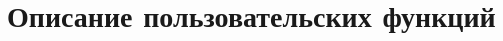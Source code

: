 \section{Описание пользовательских функций}

\begin{comment}

Все функции и модули, реализованные в ходе выполнения данной курсовой работы, представленны в таблице \ref{funcsnmodules}.

\begin{table}[h!]
	\caption{Описание пользовательских функций и модулей программы}
    \centering
	\label{funcsnmodules}
    \scalebox{1}{
	\begin{tabular}{|p{2.5cm}|p{4cm}|p{2.5cm}|p{2cm}|p{1.5cm}|}
		\hline
		Имя модуля & Имя функции & Назначение & Параметры функции & Возращ\nl аемое значение функции \\
		\hline
		truck\_brand.h & str & Получение марки грузовика в виде строки & TruckBrand truck\_brand & std::string\\
		\hline
        
        administrator\nl\_console.h & AdministratorConsole & use-case & - & returns\\
        \hline
        administrator\nl\_console.h & Run & use-case & - & returns\\
        \hline
        administrator\nl\_console.h & \_loadRealPassword & use-case & - & returns\\
        \hline
        administrator\nl\_console.h & \_uploadPassword & use-case & - & returns\\
        \hline
        administrator\nl\_console.h & \_getch & use-case & - & returns\\
        \hline
        administrator\nl\_console.h & \_inputPassword & use-case & - & returns\\
        \hline
        administrator\nl\_console.h & \_verifyPassword & use-case & - & returns\\
        \hline
        administrator\nl\_console.h & \_mainMenu & use-case & - & returns\\
        \hline
        administrator\nl\_console.h & \_truckMenu & use-case & - & returns\\
        \hline
        administrator\nl\_console.h & \_driverMenu & use-case & - & returns\\
        \hline
        administrator\nl\_console.h & \_routeMenu & use-case & - & returns\\
        \hline
        administrator\nl\_console.h & \_changePassword & use-case & - & returns\\
        \hline
	\end{tabular} 
    }
\end{table}

\end{comment}

